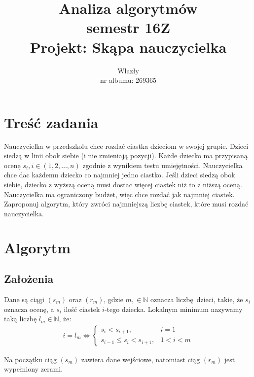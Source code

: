 \documentclass{article}
\title{\vspace{7cm}\LARGE Analiza algorytmów\\semestr 16Z\\Projekt: Skąpa nauczycielka}
\author{\LargeŁukasz Wlazły\\nr albumu: 269365}
\date{}
\begin{document}
	\maketitle
	\newpage

	\section{Treść zadania}

	Nauczycielka w przedszkolu chce rozdać ciastka dzieciom w swojej grupie. Dzieci siedzą w linii obok siebie (i nie zmieniają pozycji). Każde dziecko ma przypisaną ocenę $  s_{i}, i \in (1, 2, \ldots, n) $ zgodnie z wynikiem testu umiejętności.
	Nauczycielka chce dac każdemu dziecko co najmniej jedno ciastko. Jeśli dzieci siedzą obok siebie, dziecko z wyższą oceną musi dostac więcej ciastek niż to z niższą oceną. Nauczycielka ma ograniczony budżet, więc chce rozdać jak najmniej ciastek. Zaproponuj algorytm, który zwróci najmniejszą liczbę ciastek, które musi rozdać nauczycielka.

	\section{Algorytm}

	\subsection{Założenia}

	Dane są ciągi $(s_{m})$ oraz $(r_{m})$, gdzie $m, \in \mathbb{N}$ oznacza liczbę dzieci, takie, że $s_{i}$ oznacza ocenę, a $s_{i}$ ilość ciastek $i$-tego dziecka.
	Lokalnym minimum nazywamy taką liczbę $l_m\in\mathbb{N}$, że:
	\begin{align*}
		i = l_m \Leftrightarrow
		\begin{cases}
			s_{i} < s_{i + 1}, & i = 1 \\
			s_{i-1} \leq s_{i} < s_{i+1}, & 1 < i < m
		\end{cases}
	\end{align*}

	Na początku ciąg $(s_{m})$ zawiera dane wejściowe, natomiast ciąg $(r_{m})$ jest wypełniony zerami. \\
\end{document}
